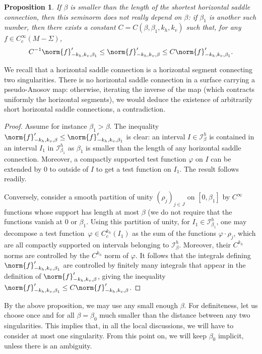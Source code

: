 \documentclass[10pt]{amsart}
\newcommand{\boI}{\mathcal{I}}
\let\phi\varphi
\newtheorem{prop}[thm]{Proposition}
\theoremstyle{definition}
\numberwithin{equation}{section}
\begin{document}
\begin{prop}
\label{prop:beta_irrelevant} If $\beta$ is smaller than the length of the
shortest horizontal saddle connection, then this seminorm does not really
depend on $\beta$: if $\beta_1$ is another such number, then there exists a
constant $C=C(\beta, \beta_1, k_h, k_v)$ such that, for any $f \in
C^\infty_c(M-\Sigma)$,
\begin{equation*}
C^{-1}\norm{f}'_{-k_h, k_v, \beta_1} \leq \norm{f}'_{-k_h, k_v, \beta} \leq C\norm{f}'_{-k_h, k_v, \beta_1}.
\end{equation*}
\end{prop}
We recall that a horizontal saddle connection is a horizontal segment
connecting two singularities. There is no horizontal saddle connection in a
surface carrying a pseudo-Anosov map: otherwise, iterating the inverse of the
map (which contracts uniformly the horizontal segments), we would deduce the
existence of arbitrarily short horizontal saddle connections, a
contradiction.
\begin{proof}
Assume for instance $\beta_1>\beta$. The inequality $\norm{f}'_{-k_h, k_v,
\beta} \leq \norm{f}'_{-k_h, k_v, \beta_1}$ is clear: an interval $I \in
\boI^h_\beta$ is contained in an interval $I_1$ in $\boI^h_{\beta_1}$ as
$\beta_1$ is smaller than the length of any horizontal saddle connection.
Moreover, a compactly supported test function $\phi$ on $I$ can be extended
by $0$ to outside of $I$ to get a test function on $I_1$. The result follows
readily.

Conversely, consider a smooth partition of unity $(\rho_j)_{j\in J}$ on
$[0,\beta_1]$ by $C^\infty$ functions whose support has length at most
$\beta$ (we do not require that the functions vanish at $0$ or $\beta_1$.
Using this partition of unity, for $I_1 \in \boI^h_{\beta_1}$, one may
decompose a test function~\hbox{$\phi\in C^{k_h}_c(I_1)$} as the sum of the
functions $\phi\cdot \rho_j$, which are all compactly supported on intervals
belonging to $\boI^h_{\beta}$. Moreover, their $C^{k_h}$ norms are controlled
by the $C^{k_h}$ norm of $\phi$. It follows that the integrals defining
$\norm{f}'_{-k_h, k_v, \beta_1}$ are controlled by finitely many integrals
that appear in the definition of $\norm{f}'_{-k_h, k_v, \beta}$, giving the
inequality $\norm{f}'_{-k_h, k_v, \beta_1} \leq C \norm{f}'_{-k_h, k_v,
\beta}$.
\end{proof}

By the above proposition, we may use any small enough $\beta$. For
definiteness, let us choose once and for all $\beta=\beta_0$ much smaller
than the distance between any two singularities. This implies that, in all
the local discussions, we will have to consider at most one singularity. From
this point on, we will keep $\beta_0$ implicit, unless there is an ambiguity.
\end{document}
